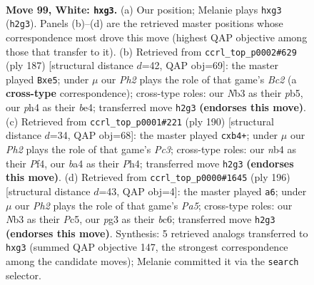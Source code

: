 \documentclass[11pt]{article}
\begin{document}
\clearpage

\begin{figure}[p]\centering
\begin{subfigure}{0.46\textwidth}\centering
\resizebox{\linewidth}{!}{%
\newchessgame
\chessboard[
  setfen={3r4/5pk1/6p1/4P3/bnB2P1p/1N4p1/5K1P/8 w - - 0 99},
  showmover=false,
  pgfstyle=straightmove, color=movearrow, markmove={h2-g3}
]}
\caption{}
\end{subfigure}\hfill
\begin{subfigure}{0.46\textwidth}\centering
\resizebox{\linewidth}{!}{%
\newchessgame
\chessboard[
  setfen={8/2b5/5kp1/1P2P2p/4B2P/6PK/8/8 b - - 0 94},
  showmover=false,
  pgfstyle=straightmove, color=movearrow, markmove={c7-e5}
]}
\caption{}
\end{subfigure}
\\[4pt]
\begin{subfigure}{0.46\textwidth}\centering
\resizebox{\linewidth}{!}{%
\newchessgame
\chessboard[
  setfen={2b5/5Bp1/1p3p2/2k5/Pp3P1P/K1P5/8/8 w - - 0 96},
  showmover=false,
  pgfstyle=straightmove, color=movearrow, markmove={c3-b4}
]}
\caption{}
\end{subfigure}\hfill
\begin{subfigure}{0.46\textwidth}\centering
\resizebox{\linewidth}{!}{%
\newchessgame
\chessboard[
  setfen={8/8/2b3kp/P1P2pp1/7P/4B3/6P1/7K w - - 0 99},
  showmover=false,
  pgfstyle=straightmove, color=movearrow, markmove={a5-a6}
]}
\caption{}
\end{subfigure}
\caption{\textbf{Move 99, White: \texttt{hxg3}.} (a) Our position; Melanie plays \texttt{hxg3} (\texttt{h2g3}). Panels (b)--(d) are the retrieved master positions whose correspondence most drove this move (highest QAP objective among those that transfer to it). (b) Retrieved from \texttt{ccrl\_top\_p0002\#629} (ply 187) [structural distance $d$=42, QAP obj=69]: the master played \texttt{Bxe5}; under $\mu$ our \emph{Ph2} plays the role of that game's \emph{Bc2} (a \textbf{cross-type} correspondence); cross-type roles: our \emph{N}b3 as their \emph{p}b5, our \emph{p}h4 as their \emph{b}e4; transferred move \texttt{h2g3} \textbf{(endorses this move)}. (c) Retrieved from \texttt{ccrl\_top\_p0001\#221} (ply 190) [structural distance $d$=34, QAP obj=68]: the master played \texttt{cxb4+}; under $\mu$ our \emph{Ph2} plays the role of that game's \emph{Pc3}; cross-type roles: our \emph{n}b4 as their \emph{P}f4, our \emph{b}a4 as their \emph{P}h4; transferred move \texttt{h2g3} \textbf{(endorses this move)}. (d) Retrieved from \texttt{ccrl\_top\_p0000\#1645} (ply 196) [structural distance $d$=43, QAP obj=4]: the master played \texttt{a6}; under $\mu$ our \emph{Ph2} plays the role of that game's \emph{Pa5}; cross-type roles: our \emph{N}b3 as their \emph{P}c5, our \emph{p}g3 as their \emph{b}c6; transferred move \texttt{h2g3} \textbf{(endorses this move)}. Synthesis: 5 retrieved analogs transferred to \texttt{hxg3} (summed QAP objective 147, the strongest correspondence among the candidate moves); Melanie committed it via the \texttt{search} selector.}
\label{fig:thought-m196}
\end{figure}
\end{document}
